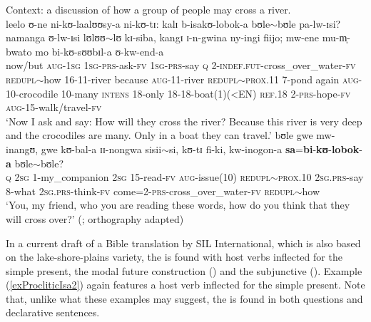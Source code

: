 \begin{exe}
\ex \label{exProcliticIsa1}
Context: a discussion of how a group of people may cross a river.\\
 \gll leelo ʊ-ne ni-kʊ-laalʊʊsy-a ni-kʊ-tɪ: kalɪ b-isakʊ-lobok-a bʊle$\sim$bʊle pa-lw-ɪsi? namanga ʊ-lw-ɪsi lʊlʊʊ$\sim$lʊ kɪ-siba, kangɪ ɪ-n-gwina ny-ingi fiijo; mw-ene mu-m̩-bwato mo bi-kʊ-sʊʊbɪl-a ʊ-kw-end-a\\
now/but \textsc{aug}-\textsc{1sg} \textsc{1sg}-\textsc{prs}-ask-\textsc{fv} \textsc{1sg}-\textsc{prs}-say \textsc{q} 2-\textsc{indef.fut}-cross\_over\_water-\textsc{fv} \textsc{redupl}$\sim$how 16-11-river because \textsc{aug}-11-river \textsc{redupl}$\sim$\textsc{prox.11} 7-pond again \textsc{aug}-10-crocodile 10-many \textsc{intens} 18-only 18-18-boat(1)(<EN) \textsc{ref.18} 2-\textsc{prs}-hope-\textsc{fv} \textsc{aug}-15-walk/travel-\textsc{fv}\\
\glt \lq Now I ask and say: How will they cross the river? Because this river is very deep and the crocodiles are many. Only in a boat they can travel.'
\sn \gll  bʊle gwe mw-inangʊ, gwe kʊ-bal-a ɪɪ-nongwa sisii$\sim$si, kʊ-tɪ fi-ki, kw-inogon-a \textbf{sa}=\textbf{bi}-\textbf{kʊ}-\textbf{lobok}-\textbf{a} bʊle$\sim$bʊle?\\
\textsc{q} \textsc{2sg} 1-my\_companion \textsc{2sg} 15-read-\textsc{fv} \textsc{aug}-issue(10) \textsc{redupl}$\sim$\textsc{prox.10} \textsc{2sg.prs}-say 8-what \textsc{2sg.prs}-think-\textsc{fv} come=2-\textsc{prs}-cross\_over\_water-\textsc{fv} \textsc{redupl}$\sim$how\\
\glt \lq  You, my friend, who you are reading these words, how do you think that they will cross over?' (\citealt[150]{BergerP1933};  orthography adapted)
\end{exe}

In a current draft of a Bible translation by SIL International, which is also based on the lake-shore-plains variety, the  is found with host verbs inflected for the simple present, the modal future construction () and the subjunctive (). Example (\ref{exProcliticIsa2}) again features a host verb inflected for the simple present. Note that, unlike what these examples may suggest, the  is found in both questions and declarative sentences. 

